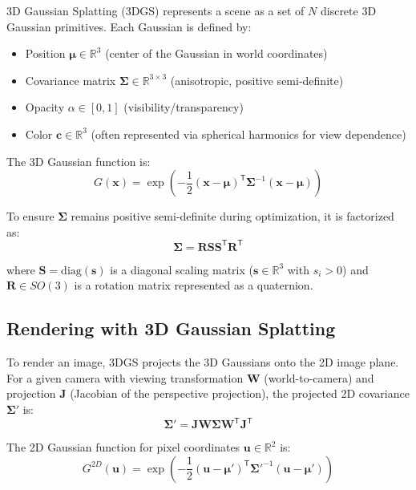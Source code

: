 \documentclass[12pt,a4paper,oneside]{report}
\begin{document}
3D Gaussian Splatting (3DGS) represents a scene as a set of $N$ discrete 3D Gaussian primitives. Each Gaussian is defined by:
\begin{itemize}
    \item Position $\boldsymbol{\mu} \in \mathbb{R}^3$ (center of the Gaussian in world coordinates)
    \item Covariance matrix $\boldsymbol{\Sigma} \in \mathbb{R}^{3 \times 3}$ (anisotropic, positive semi-definite)
    \item Opacity $\alpha \in [0, 1]$ (visibility/transparency)
    \item Color $\mathbf{c} \in \mathbb{R}^3$ (often represented via spherical harmonics for view dependence)
\end{itemize}

The 3D Gaussian function is:
\begin{equation}G(\mathbf{x}) = \exp\left(-\frac{1}{2} (\mathbf{x} - \boldsymbol{\mu})^\mathsf{T} \boldsymbol{\Sigma}^{-1} (\mathbf{x} - \boldsymbol{\mu})\right)
\end{equation}

To ensure $\boldsymbol{\Sigma}$ remains positive semi-definite during optimization, it is factorized as:
\begin{equation}\boldsymbol{\Sigma} = \mathbf{R} \mathbf{S} \mathbf{S}^\mathsf{T} \mathbf{R}^\mathsf{T}
\end{equation}

where $\mathbf{S} = \text{diag}(\mathbf{s})$ is a diagonal scaling matrix ($\mathbf{s} \in \mathbb{R}^3$ with $s_i > 0$) and $\mathbf{R} \in SO(3)$ is a rotation matrix represented as a quaternion.
\subsection{Rendering with 3D Gaussian Splatting}
\label{subsec:rendering_with_3d_gaussian_splatting}

To render an image, 3DGS projects the 3D Gaussians onto the 2D image plane. For a given camera with viewing transformation $\mathbf{W}$ (world-to-camera) and projection $\mathbf{J}$ (Jacobian of the perspective projection), the projected 2D covariance $\boldsymbol{\Sigma}'$ is:
\begin{equation}\boldsymbol{\Sigma}' = \mathbf{J} \mathbf{W} \boldsymbol{\Sigma} \mathbf{W}^\mathsf{T} \mathbf{J}^\mathsf{T}
\end{equation}

The 2D Gaussian function for pixel coordinates $\mathbf{u} \in \mathbb{R}^2$ is:
\begin{equation}G^{2D}(\mathbf{u}) = \exp\left(-\frac{1}{2} (\mathbf{u} - \boldsymbol{\mu}')^\mathsf{T} \boldsymbol{\Sigma}'^{-1} (\mathbf{u} - \boldsymbol{\mu}')\right)
\end{equation}
\end{document}
